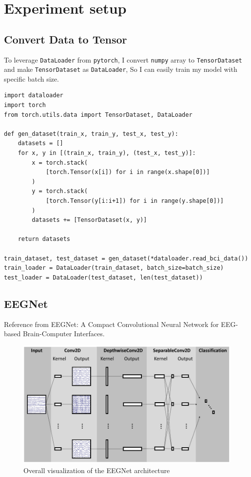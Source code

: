 \documentclass[12pt]{article}
\begin{document}
\section{Experiment setup}

\subsection{Convert Data to Tensor}

To leverage \verb|DataLoader| from  \verb|pytorch|, I convert  \verb|numpy| array to  \verb|TensorDataset| and make  \verb|TensorDataset| as  \verb|DataLoader|, So I can easily train my model with specific batch size.

\begin{verbatim}
import dataloader
import torch
from torch.utils.data import TensorDataset, DataLoader

def gen_dataset(train_x, train_y, test_x, test_y):
    datasets = []
    for x, y in [(train_x, train_y), (test_x, test_y)]:
        x = torch.stack(
            [torch.Tensor(x[i]) for i in range(x.shape[0])]
        )
        y = torch.stack(
            [torch.Tensor(y[i:i+1]) for i in range(y.shape[0])]
        )
        datasets += [TensorDataset(x, y)]
        
    return datasets

train_dataset, test_dataset = gen_dataset(*dataloader.read_bci_data())
train_loader = DataLoader(train_dataset, batch_size=batch_size)
test_loader = DataLoader(test_dataset, len(test_dataset))
\end{verbatim}

\subsection{EEGNet}

Reference from EEGNet: A Compact Convolutional Neural Network for EEG-based Brain-Computer Interfaces. 

\begin{figure}[H]
\centering
\includegraphics[width=\linewidth]{Images/OverallEEGNet.png}
\caption{Overall visualization of the EEGNet architecture}
\end{figure}
\end{document}
